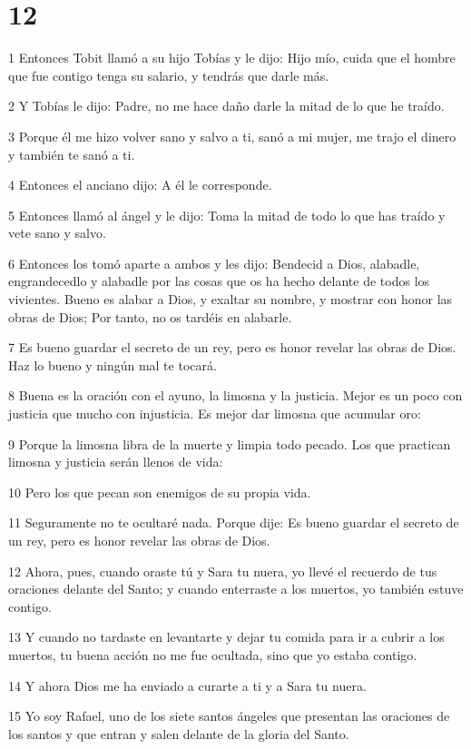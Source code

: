 \chapter{12}

\par 1 Entonces Tobit llamó a su hijo Tobías y le dijo: Hijo mío, cuida que el hombre que fue contigo tenga su salario, y tendrás que darle más.
\par 2 Y Tobías le dijo: Padre, no me hace daño darle la mitad de lo que he traído.
\par 3 Porque él me hizo volver sano y salvo a ti, sanó a mi mujer, me trajo el dinero y también te sanó a ti.
\par 4 Entonces el anciano dijo: A él le corresponde.
\par 5 Entonces llamó al ángel y le dijo: Toma la mitad de todo lo que has traído y vete sano y salvo.
\par 6 Entonces los tomó aparte a ambos y les dijo: Bendecid a Dios, alabadle, engrandecedlo y alabadle por las cosas que os ha hecho delante de todos los vivientes. Bueno es alabar a Dios, y exaltar su nombre, y mostrar con honor las obras de Dios; Por tanto, no os tardéis en alabarle.
\par 7 Es bueno guardar el secreto de un rey, pero es honor revelar las obras de Dios. Haz lo bueno y ningún mal te tocará.
\par 8 Buena es la oración con el ayuno, la limosna y la justicia. Mejor es un poco con justicia que mucho con injusticia. Es mejor dar limosna que acumular oro:
\par 9 Porque la limosna libra de la muerte y limpia todo pecado. Los que practican limosna y justicia serán llenos de vida:
\par 10 Pero los que pecan son enemigos de su propia vida.
\par 11 Seguramente no te ocultaré nada. Porque dije: Es bueno guardar el secreto de un rey, pero es honor revelar las obras de Dios.
\par 12 Ahora, pues, cuando oraste tú y Sara tu nuera, yo llevé el recuerdo de tus oraciones delante del Santo; y cuando enterraste a los muertos, yo también estuve contigo.
\par 13 Y cuando no tardaste en levantarte y dejar tu comida para ir a cubrir a los muertos, tu buena acción no me fue ocultada, sino que yo estaba contigo.
\par 14 Y ahora Dios me ha enviado a curarte a ti y a Sara tu nuera.
\par 15 Yo soy Rafael, uno de los siete santos ángeles que presentan las oraciones de los santos y que entran y salen delante de la gloria del Santo.
